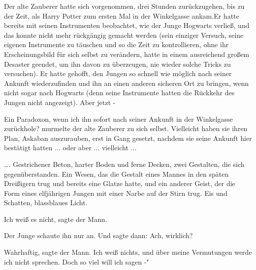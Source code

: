 Der alte Zauberer hatte sich vorgenommen, drei Stunden zurückzugehen, bis zu der
Zeit, als Harry Potter zum ersten Mal in der Winkelgasse ankam.Er hatte bereits
mit seinen Instrumenten beobachtet, wie der Junge Hogwarts verließ, und das
konnte nicht mehr rückgängig gemacht werden (sein einziger Versuch, seine
eigenen Instrumente zu täuschen und so die Zeit zu kontrollieren, ohne ihr
Erscheinungsbild für sich selbst zu verändern, hatte in einem ausreichend großem
Desaster geendet, um ihn davon zu überzeugen, nie wieder solche Tricks zu
versuchen). Er hatte gehofft, den Jungen so schnell wie möglich nach seiner
Ankunft wiederzufinden und ihn an einen anderen sicheren Ort zu bringen, wenn
nicht sogar nach Hogwarts (denn seine Instrumente hatten die Rückkehr des Jungen
nicht angezeigt). Aber jetzt -

\glqq Ein Paradoxon, wenn ich ihn sofort nach seiner Ankunft in der Winkelgasse
zurückhole?\grqq{} murmelte der alte Zauberer zu sich selbst. \glqq Vielleicht
haben sie ihren Plan, Askaban auszurauben, erst in Gang gesetzt, nachdem sie
seine Ankunft hier bestätigt hatten ... oder aber ... vielleicht ...\grqq{}

…. Gestrichener Beton, harter Boden und ferne Decken, zwei Gestalten, die sich
gegenüberstanden. Ein Wesen, das die Gestalt eines Mannes in den späten
Dreißigern trug und bereits eine Glatze hatte, und ein anderer Geist, der die
Form eines elfjährigen Jungen mit einer Narbe auf der Stirn trug. Eis und
Schatten, blassblaues Licht.

\glqq Ich weiß es nicht\grqq{}, sagte der Mann.

Der Junge schaute ihn nur an. Und sagte dann: \glqq Ach, wirklich?\grqq{}

\glqq Wahrhaftig\grqq{}, sagte der Mann. \glqq Ich weiß nichts, und über meine
Vermutungen werde ich nicht sprechen. Doch so viel will ich sagen -"

